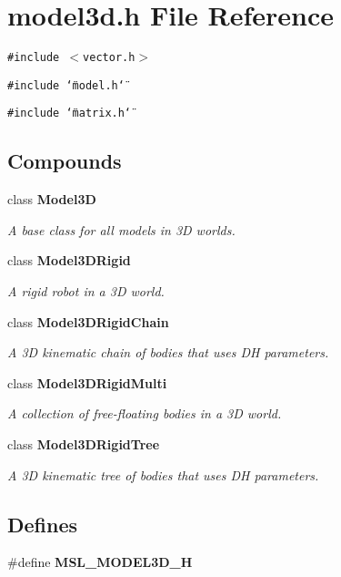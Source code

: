\section{model3d.h File Reference}
\label{model3d_8h}
{\tt \#include $<$vector.h$>$}\par
{\tt \#include \char`\"{}model.h\char`\"{}}\par
{\tt \#include \char`\"{}matrix.h\char`\"{}}\par
\subsection*{Compounds}
\begin{CompactItemize}
\item 
class {\bf Model3D}
\begin{CompactList}\small\item\em A base class for all models in 3D worlds.\item\end{CompactList}\item 
class {\bf Model3DRigid}
\begin{CompactList}\small\item\em A rigid robot in a 3D world.\item\end{CompactList}\item 
class {\bf Model3DRigid\-Chain}
\begin{CompactList}\small\item\em A 3D kinematic chain of bodies that uses DH parameters.\item\end{CompactList}\item 
class {\bf Model3DRigid\-Multi}
\begin{CompactList}\small\item\em A collection of free-floating bodies in a 3D world.\item\end{CompactList}\item 
class {\bf Model3DRigid\-Tree}
\begin{CompactList}\small\item\em A 3D kinematic tree of bodies that uses DH parameters.\item\end{CompactList}\end{CompactItemize}
\subsection*{Defines}
\begin{CompactItemize}
\item 
\#define {\bf MSL\_\-MODEL3D\_\-H}
\end{CompactItemize}


